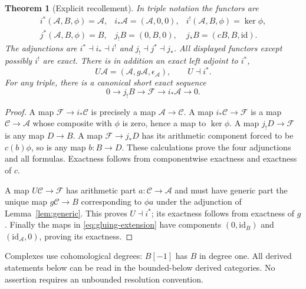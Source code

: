 \documentclass[11pt,a4paper]{article}
\newtheorem{theorem}{Theorem}[section]
\theoremstyle{definition}\newtheorem{definition}[theorem]{Definition}
\begin{document}
\begin{theorem}[Explicit recollement]\label{thm:recollement}
In triple notation the functors are
\[
\begin{array}{lll}
 i^*(\mathcal A,B,\phi)=\mathcal A,&
 i_*\mathcal A=(\mathcal A,0,0),&
 i^!(\mathcal A,B,\phi)=\ker\phi,\\[2pt]
 j^*(\mathcal A,B,\phi)=B,&
 j_!B=(0,B,0),&
 j_*B=(cB,B,\mathrm{id}).
\end{array}
 \tag{RP4}\label{eq:six-functors}
\]
The adjunctions are $i^*\dashv i_*\dashv i^!$ and
$j_!\dashv j^*\dashv j_*$. All displayed functors except possibly
$i^!$ are exact. There is in addition an exact left adjoint to $i^*$,
\[
 U\mathcal A=(\mathcal A,g\mathcal A,\epsilon_{\mathcal A}),
 \qquad U\dashv i^*.
 \tag{RP5}\label{eq:universal-coupling}
\]
For any triple, there is a canonical short exact sequence
\[
 0\longrightarrow j_!B\longrightarrow\mathcal F
 \longrightarrow i_*\mathcal A\longrightarrow0.
 \tag{RP6}\label{eq:gluing-extension}
\]
\end{theorem}
\begin{proof}
A map $\mathcal F\to i_*\mathcal C$ is precisely a map
$\mathcal A\to\mathcal C$. A map $i_*\mathcal C\to\mathcal F$
is a map $\mathcal C\to\mathcal A$ whose composite with $\phi$ is zero,
hence a map to $\ker\phi$. A map $j_!D\to\mathcal F$ is any map
$D\to B$. A map $\mathcal F\to j_*D$ has its arithmetic component
forced to be $c(b)\phi$, so is any map $b:B\to D$. These calculations
prove the four adjunctions and all formulas. Exactness follows from
componentwise exactness and exactness of $c$.

A map $U\mathcal C\to\mathcal F$ has arithmetic part
$a:\mathcal C\to\mathcal A$ and must have generic part the unique map
$g\mathcal C\to B$ corresponding to $\phi a$ under the adjunction
of Lemma~\ref{lem:generic}. This proves $U\dashv i^*$; its exactness
follows from exactness of $g$. Finally the maps in
\eqref{eq:gluing-extension} have components $(0,\mathrm{id}_B)$ and
$(\mathrm{id}_{\mathcal A},0)$, proving its exactness.
\end{proof}

Complexes use cohomological degrees: $B[-1]$ has $B$ in degree one.
All derived statements below can be read in the bounded-below derived
categories. No assertion requires an unbounded resolution convention.
\end{document}
